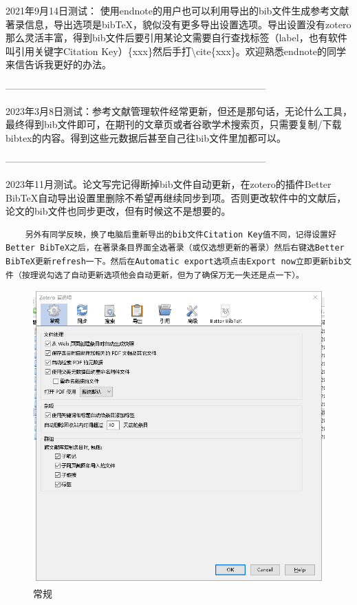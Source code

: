 2021年9月14日测试：
使用endnote的用户也可以利用导出的bib文件生成参考文献著录信息，导出选项是bibTeX，貌似没有更多导出设置选项。导出设置没有zotero那么灵活丰富，得到bib文件后要引用某论文需要自行查找标签（label，也有软件叫引用关键字Citation Key）\{xxx\}然后手打\textbackslash{}cite\{xxx\}。欢迎熟悉endnote的同学来信告诉我更好的办法。

---------------------------------------------------------------------------------

2023年3月8日测试：参考文献管理软件经常更新，但还是那句话，无论什么工具，最终得到bib文件即可，在期刊的文章页或者谷歌学术搜索页，只需要复制/下载bibtex的内容。得到这些元数据后甚至自己往bib文件里加都可以。

---------------------------------------------------------------------------------

2023年11月测试。论文写完记得断掉bib文件自动更新，在zotero的插件Better BibTeX自动导出设置里删除不希望再继续同步到项。否则更改软件中的文献后，论文的bib文件也同步更改，但有时候这不是想要的。
\begin{lstlisting}
    另外有同学反映，换了电脑后重新导出的bib文件Citation Key值不同，记得设置好Better BibTeX之后，在著录条目界面全选著录（或仅选想更新的著录）然后右键选Better BibTeX更新refresh一下。然后在Automatic export选项点击Export now立即更新bib文件（按理说勾选了自动更新选项他会自动更新，但为了确保万无一失还是点一下）。
\end{lstlisting}
\begin{figure}
	\centering
	\includegraphics[scale=0.8]{Fig/zotero1.png}
	\caption{\label{op1}常规}
\end{figure}
